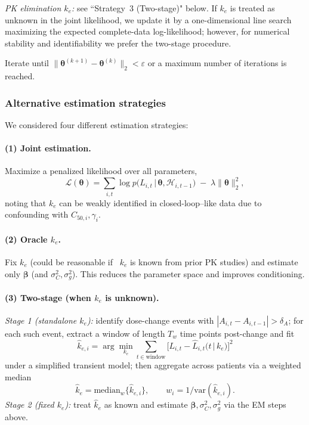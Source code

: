 \emph{PK elimination $k_e$:} see ``Strategy~3 (Two-stage)" below. If $k_e$ is treated as unknown in the joint likelihood, we update it by a one-dimensional line search maximizing the expected complete-data log-likelihood; however, for numerical stability and identifiability we prefer the two-stage procedure.

Iterate until $\|\boldsymbol{\theta}^{(k+1)} - \boldsymbol{\theta}^{(k)}\|_2 < \varepsilon$ or a maximum number of iterations is reached.

\subsubsection*{Alternative estimation strategies}
We considered four different estimation strategies:

\paragraph{(1) Joint estimation.}
Maximize a penalized likelihood over all parameters,
\[
\mathcal{L}(\boldsymbol{\theta})
= 
\sum_{i,t} \log p\!\big(L_{i,t}\,\big|\, \boldsymbol{\theta}, \mathcal{H}_{i,t-1}\big)
\;-\;\lambda \|\boldsymbol{\theta}\|_2^2,
\]
noting that $k_e$ can be weakly identified in closed-loop--like data due to confounding with $C_{50,i},\gamma_i$.

\paragraph{(2) Oracle $k_e$.}
Fix $k_e$ (could be reasonable if \ $k_e$ is known from prior PK studies) and estimate only $\boldsymbol{\beta}$ (and $\sigma_C^2,\sigma_g^2$). This reduces the parameter space and improves conditioning.

\paragraph{(3) Two-stage (when $k_e$ is unknown).}
\emph{Stage 1 (standalone $k_e$):} identify dose-change events with $|A_{i,t}-A_{i,t-1}|>\delta_A$; for each such event, extract a window of length $T_w$ time points post-change and fit
\[
\hat{k}_{e,i}
= \arg\min_{k_e} 
\sum_{t \in \text{window}} \Big[L_{i,t} - \hat L_{i,t}\big(t \,|\, k_e\big)\Big]^2
\]
under a simplified transient model; then aggregate across patients via a weighted median
\[
\hat{k}_e = \mathrm{median}_w\{\hat{k}_{e,i}\}, \qquad w_i = 1/\mathrm{var}(\hat{k}_{e,i}).
\]
\emph{Stage 2 (fixed $k_e$):} treat $\hat k_e$ as known and estimate $\boldsymbol{\beta},\sigma_C^2,\sigma_g^2$ via the EM steps above.

